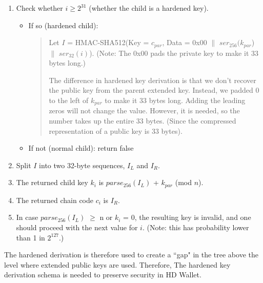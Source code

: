 \begin{enumerate}
    \item Check whether $i \geq 2^{31}$ (whether the child is a hardened key).
          \begin{itemize}
              \item If so (hardened child):
                    \begin{quote}

                        Let $I$ = HMAC-SHA512(Key = $c_{par}$, Data = 0x00 $\parallel$ $ser_{256}(k_{par}$) $\parallel$ $ser_{32}(i)$). (Note: The 0x00 pads the private key to make it 33 bytes long.)

                        The difference in hardened key derivation is that we don't recover the public key from the parent extended key. Instead, we padded 0 to the left of $k_{par}$ to make it 33 bytes long. Adding the leading zeros will not change the value. However, it is needed, so the number takes up the entire 33 bytes. (Since the compressed representation of a public key is 33 bytes).
                    \end{quote}


              \item If not (normal child): return false

          \end{itemize}
          \bigskip

    \item Split $I$ into two 32-byte sequences, $I_L$ and $I_R$.
          \bigskip

    \item The returned child key $k_i$ is $parse_{256}(I_L)$ + $k_{par}$ (mod $n$).
          \bigskip

    \item The returned chain code $c_i$ is $I_R$.
          \bigskip

    \item In case $parse_{256}(I_L)$ $\geq$ n or $k_i$ = 0, the resulting key is invalid, and one should proceed with the next value for $i$. (Note: this has probability lower than 1 in $2^{127}$.)

\end{enumerate}

The hardened derivation is therefore used to create a ``gap" in the tree above the level where extended public keys are used. Therefore, The hardened key derivation schema is needed to preserve security in HD Wallet.

